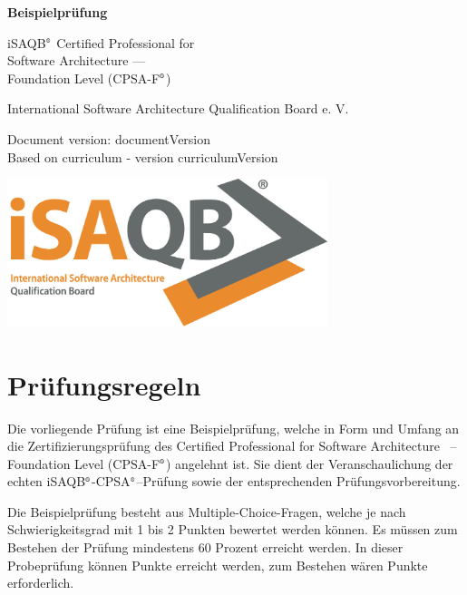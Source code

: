 \documentclass[12pt,a4paper]{article}
\newcounter{examQuestion}\setcounter{examQuestion}{1}
\newcommand{\registered}{$^\textrm{\tiny\textregistered}$}
\begin{document}
\pagestyle{fancy}

\begin{titlepage}
  \begin{center}
   {\huge\bfseries Beispielprüfung

     iSAQB\registered{} Certified Professional for\\ Software Architecture ---\\[2ex]
     
     Foundation Level (CPSA-F\registered{})}

  \bigskip
  
  {\large International Software Architecture Qualification Board
    e. V.}

  \bigskip

  Document version: {{documentVersion}}\\
  Based on curriculum - version {{curriculumVersion}}
\end{center}

\vspace*{\fill}

\begin{center}
  \includegraphics[width=0.7\textwidth]{isaqb-logo}
\end{center}
\end{titlepage}

\section*{Prüfungsregeln}

Die vorliegende Prüfung ist eine Beispielprüfung, welche in Form und
Umfang an die Zertifizierungsprüfung des Certified Professional for
Software Architecture ~-- Foundation Level (CPSA-F\registered{})
angelehnt ist. Sie dient der Veranschaulichung der echten
iSAQB\registered{}-CPSA\registered{}--Prüfung sowie der entsprechenden
Prüfungsvorbereitung.

Die Beispielprüfung besteht aus \examQuestionCount{} Multiple-Choice-Fragen, welche je
nach Schwierigkeitsgrad mit 1 bis 2 Punkten bewertet werden können. Es
müssen zum Bestehen der Prüfung mindestens 60 Prozent erreicht
werden. In dieser Probeprüfung können \examTotalPoints{} Punkte erreicht werden, zum
Bestehen wären \examMinPoints{} Punkte erforderlich.
\end{document}
